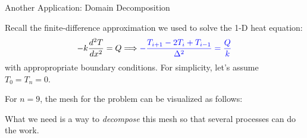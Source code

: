 \documentclass[10pt,handout]{beamer}
\begin{document}
\begin{frame}{Another Application: Domain Decomposition}

Recall the finite-difference approximation we used to solve the 
1-D heat equation:
\begin{equation*}
 -k \frac{d^2 T}{dx^2} = Q \Longrightarrow \textcolor{blue}{ -\frac{T_{i+1} - 2T_i + T_{i-1}}{\Delta^2} = \frac{Q}{k}}
\end{equation*}
with appropropriate boundary conditions.  For simplicity, let's assume
$T_0 = T_n = 0$.  

\vfill 

For $n=9$, the mesh for the problem can be visualized as follows:
\vfill 
\begin{center}
\end{center}
\vfill 
What we need is a way to {\it decompose} this mesh so that
several processes can do the work.

\end{frame}
\end{document}
